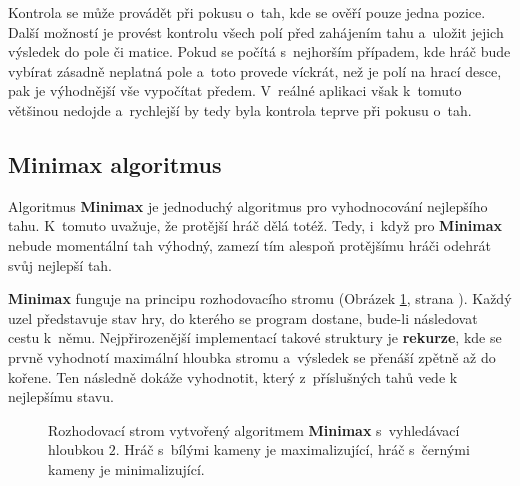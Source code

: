 Kontrola se může provádět při pokusu o~tah, kde se ověří pouze jedna pozice. Další možností je provést kontrolu všech polí před zahájením tahu a~uložit jejich výsledek do pole či matice. Pokud se počítá s~nejhorším případem, kde hráč bude vybírat zásadně neplatná pole a~toto provede víckrát, než je polí na hrací desce, pak je výhodnější vše vypočítat předem. V~reálné aplikaci však k~tomuto většinou nedojde a~rychlejší by tedy byla kontrola teprve při pokusu o~tah.

\subsection{Minimax algoritmus}

Algoritmus \textbf{Minimax} je jednoduchý algoritmus pro vyhodnocování nejlepšího tahu. K~tomuto uvažuje, že protější hráč dělá totéž. Tedy, i~když pro \textbf{Minimax} nebude momentální tah výhodný, zamezí tím alespoň protějšímu hráči odehrát svůj nejlepší tah.

\textbf{Minimax} funguje na principu rozhodovacího stromu (Obrázek \ref{img:minimax}, strana \pageref{img:minimax}). Každý uzel představuje stav hry, do kterého se program dostane, bude-li následovat cestu k~němu. Nejpřirozenější implementací takové struktury je \textbf{rekurze}, kde se prvně vyhodnotí maximální hloubka stromu a~výsledek se přenáší zpětně až do kořene. Ten následně dokáže vyhodnotit, který z~příslušných tahů vede k nejlepšímu stavu.

\begin{figure}[h]

\centering


\caption{Rozhodovací strom vytvořený algoritmem \textbf{Minimax} s~vyhledávací hloubkou $2$. Hráč s~bílými kameny je maximalizující, hráč s~černými kameny je minimalizující.}
\label{img:minimax}

\end{figure}

